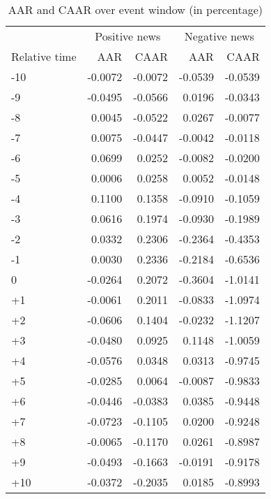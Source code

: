 \begin{table}[ht]
\centering
\begin{tabular}{lrrrr}
  \hline
   & \multicolumn{2}{c}{Positive news} & \multicolumn{2}{c}{Negative news}  \\
 Relative time & AAR & CAAR & AAR & CAAR \\
 \hline
-10 & -0.0072 & -0.0072 & -0.0539 & -0.0539 \\ 
  -9 & -0.0495 & -0.0566 & 0.0196 & -0.0343 \\ 
  -8 & 0.0045 & -0.0522 & 0.0267 & -0.0077 \\ 
  -7 & 0.0075 & -0.0447 & -0.0042 & -0.0118 \\ 
  -6 & 0.0699 & 0.0252 & -0.0082 & -0.0200 \\ 
  -5 & 0.0006 & 0.0258 & 0.0052 & -0.0148 \\ 
  -4 & 0.1100 & 0.1358 & -0.0910 & -0.1059 \\ 
  -3 & 0.0616 & 0.1974 & -0.0930 & -0.1989 \\ 
  -2 & 0.0332 & 0.2306 & -0.2364 & -0.4353 \\ 
  -1 & 0.0030 & 0.2336 & -0.2184 & -0.6536 \\ 
  0 & -0.0264 & 0.2072 & -0.3604 & -1.0141 \\ 
  +1 & -0.0061 & 0.2011 & -0.0833 & -1.0974 \\ 
  +2 & -0.0606 & 0.1404 & -0.0232 & -1.1207 \\ 
  +3 & -0.0480 & 0.0925 & 0.1148 & -1.0059 \\ 
  +4 & -0.0576 & 0.0348 & 0.0313 & -0.9745 \\ 
  +5 & -0.0285 & 0.0064 & -0.0087 & -0.9833 \\ 
  +6 & -0.0446 & -0.0383 & 0.0385 & -0.9448 \\ 
  +7 & -0.0723 & -0.1105 & 0.0200 & -0.9248 \\ 
  +8 & -0.0065 & -0.1170 & 0.0261 & -0.8987 \\ 
  +9 & -0.0493 & -0.1663 & -0.0191 & -0.9178 \\ 
  +10 & -0.0372 & -0.2035 & 0.0185 & -0.8993 \\ 
   \hline
\end{tabular}
\caption{AAR and CAAR over event window (in percentage)} 
\end{table}